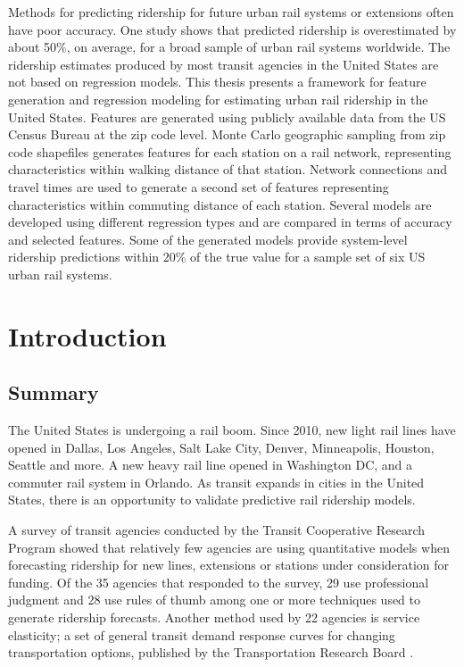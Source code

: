 \documentclass[11pt]{report}
\begin{document}
\begin{doublespace}
Methods for predicting ridership for future urban rail systems or extensions often have poor accuracy. One study shows that predicted ridership is overestimated by about 50\%, on average, for a broad sample of urban rail systems worldwide.  The ridership estimates produced by most transit agencies in the United States are not based on regression models. This thesis presents a framework for feature generation and regression modeling for estimating urban rail ridership in the  United States.  Features are generated using publicly available data from the US Census Bureau at the zip code level. Monte Carlo geographic sampling from zip code shapefiles generates features for each station on a rail network, representing characteristics within walking distance of that station. Network connections and travel times are used to generate a second set of features representing characteristics within commuting distance of each station. Several models are developed using different regression types and are compared in terms of accuracy and selected features. Some of the generated models provide system-level ridership predictions within 20\% of the true value for a sample set of six US urban rail systems.
\end{doublespace}

\renewcommand{\baselinestretch}{1.3}\selectfont
\newpage
{}
\chapter{Introduction}
\section{Summary}

The United States is undergoing a rail boom. Since 2010, new light rail lines have opened in Dallas, Los Angeles, Salt Lake City, Denver, Minneapolis, Houston, Seattle and more.  A new heavy rail line opened in Washington DC, and a commuter rail system in Orlando. As transit expands in cities in the United States, there is an opportunity to validate predictive rail ridership models. 

A survey of transit agencies \cite{Boyle2006} conducted by the Transit Cooperative Research Program showed that relatively few agencies are using quantitative models when forecasting ridership for new lines, extensions or stations under consideration for funding. Of the 35 agencies that responded to the survey, 29 use professional judgment and 28 use rules of thumb among one or more techniques used to generate ridership forecasts. Another method used by 22 agencies is service elasticity; a set of general transit demand response curves for changing transportation options, published by the Transportation Research Board \cite{tcrp95}. 
\end{document}
